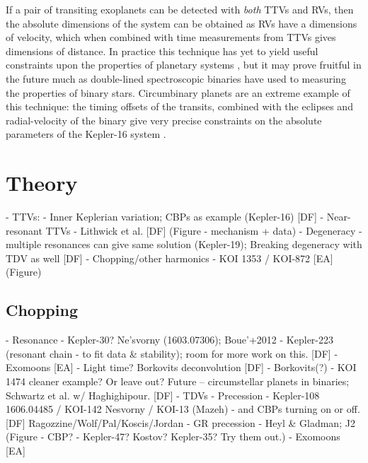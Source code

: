 \documentclass[graybox,natbib,nosecnum]{svmult}
\begin{document}
If a pair of transiting exoplanets can be detected with {\it both} TTVs and RVs, then the
absolute dimensions of the system can be obtained \citep{2005MNRAS.359..567A,
2013ApJ...762..112M} as RVs have a dimensions of velocity, which 
when combined with time measurements from TTVs gives dimensions of distance.
In practice this technique has yet to yield useful constraints upon the properties
of planetary systems \citep{2015MNRAS.453.2644A}, but it may prove fruitful
in the future much as double-lined spectroscopic binaries have used to measuring 
the properties of binary stars.  Circumbinary planets are an extreme example
of this technique: the timing offsets of the transits, combined with the eclipses
and radial-velocity of the binary give very precise constraints on the absolute parameters
of the Kepler-16 system \citep{2011Sci...333.1602D}.


\section{Theory} %
  - TTVs:
    - Inner Keplerian variation;  CBPs as example (Kepler-16) [DF]
    - Near-resonant TTVs - Lithwick et al.  [DF] (Figure - mechanism + data)
       - Degeneracy - multiple resonances can give same solution (Kepler-19); Breaking degeneracy with TDV as well [DF]
    - Chopping/other harmonics - KOI 1353 / KOI-872 [EA] (Figure)
\subsection{Chopping}


    - Resonance - Kepler-30?  Ne'svorny (1603.07306); Boue'+2012 - Kepler-223 (resonant chain - to fit data \& stability); room for more work on this.  [DF]
    - Exomoons [EA]
    - Light time?  Borkovits deconvolution [DF]
    - Borkovits(?) - KOI 1474 {cleaner example?  Or leave out?  Future -- circumstellar planets in binaries; Schwartz et al. w/ Haghighipour.} [DF]     - TDVs
       - Precession - Kepler-108 {1606.04485} / KOI-142 {Nesvorny} / KOI-13 (Mazeh) - and CBPs turning on or off.  [DF]  Ragozzine/Wolf/Pal/Koscis/Jordan - GR precession - Heyl \& Gladman; J2  (Figure - CBP? - Kepler-47? Kostov? Kepler-35? Try them out.)
    - Exomoons [EA]
\end{document}
